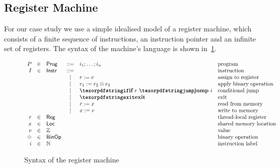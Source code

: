 \subsection{Register Machine}

For our case study we use a simple idealised model 
of a register machine, which consists of a finite 
sequence of instructions, an instruction pointer 
and an infinite set of registers. 
The syntax of the machine's language is 
shown in~\cref{fig:regmachine-syntax}.

\begin{figure}[h!]
\[
\begin{array}{rclclll}
  P &\in& \Prog   &::=& i_1 \seq \dots \seq i_n           & \text{program}                 \\

  I &\in& \Inst     &::=&                                 & \text{instruction}             \\
              & &   & | & \assignInst{r}{v}               & \text{assign to register}      \\
              & &   & | & \opInst{\otimes}{r_1}{r_2}{r_3}  & \text{apply binary operation}  \\
              & &   & | & \jumpInst{r}{\ip{i}}            & \text{conditional jump}        \\
              & &   & | & \exitInst                       & \text{exit}                    \\
              & &   & | & \readInst{r}{x}                 & \text{read from memory}        \\
              & &   & | & \writeInst{x}{v}                & \text{write to memory}         \\

  r      &\in& \Reg     &   &                    & \text{thread-local register}   \\ 
  x      &\in& \Loc     &   &                    & \text{shared memory location}  \\ 
  v      &\in& \Z       &   &                    & \text{value}                   \\
  \otimes&\in& \BinOp   &   &                    & \text{binary operation}        \\
  \ip{i} &\in& \N       &   &                    & \text{instruction label}       \\ 

\end{array}
\] 
\caption{Syntax of the register machine}
\label{fig:regmachine-syntax}
\end{figure}

